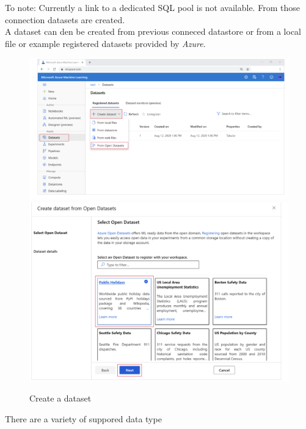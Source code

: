 To note: Currently a link to a dedicated \gls{SQL} pool is not available. From those connection datasets are created.\\

A dataset can den be created from previous conneced datastore or from a local file or example registered datasets provided by \textit{Azure}.

\begin{figure}[H]
	\centering
	\includegraphics[scale = 0.2]{attachment/chapter_10/Scc006}\\ 
		\includegraphics[scale = 0.2]{attachment/chapter_10/Scc007}
	\caption{Create a dataset}
\end{figure}

There are a variety of suppored data type 


